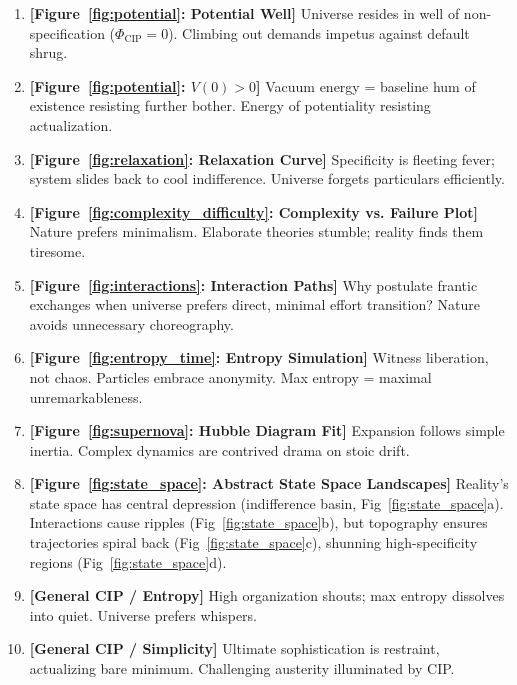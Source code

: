 \documentclass[11pt, a4paper]{article}
\newcommand{\subt}[1]{\mathrm{#1}}
\begin{document}
{{{\begin{enumerate}
    \item \textbf{[Figure~\ref{fig:potential}: Potential Well]} Universe resides in well of non-specification ($\Phi_{\subt{CIP}}=0$). Climbing out demands impetus against default shrug.
    \item \textbf{[Figure~\ref{fig:potential}: $V(0) > 0$]} Vacuum energy = baseline hum of existence resisting further bother. Energy of potentiality resisting actualization.
    \item \textbf{[Figure~\ref{fig:relaxation}: Relaxation Curve]} Specificity is fleeting fever; system slides back to cool indifference. Universe forgets particulars efficiently.
    \item \textbf{[Figure~\ref{fig:complexity_difficulty}: Complexity vs. Failure Plot]} Nature prefers minimalism. Elaborate theories stumble; reality finds them tiresome.
    \item \textbf{[Figure~\ref{fig:interactions}: Interaction Paths]} Why postulate frantic exchanges when universe prefers direct, minimal effort transition? Nature avoids unnecessary choreography.
    \item \textbf{[Figure~\ref{fig:entropy_time}: Entropy Simulation]} Witness liberation, not chaos. Particles embrace anonymity. Max entropy = maximal unremarkableness.
    \item \textbf{[Figure~\ref{fig:supernova}: Hubble Diagram Fit]} Expansion follows simple inertia. Complex dynamics are contrived drama on stoic drift.
    \item \textbf{[Figure~\ref{fig:state_space}: Abstract State Space Landscapes]} Reality's state space has central depression (indifference basin, Fig~\ref{fig:state_space}a). Interactions cause ripples (Fig~\ref{fig:state_space}b), but topography ensures trajectories spiral back (Fig~\ref{fig:state_space}c), shunning high-specificity regions (Fig~\ref{fig:state_space}d).
    \item \textbf{[General CIP / Entropy]} High organization shouts; max entropy dissolves into quiet. Universe prefers whispers.
    \item \textbf{[General CIP / Simplicity]} Ultimate sophistication is restraint, actualizing bare minimum. Challenging austerity illuminated by CIP.
\end{enumerate}

}}}
\end{document}
